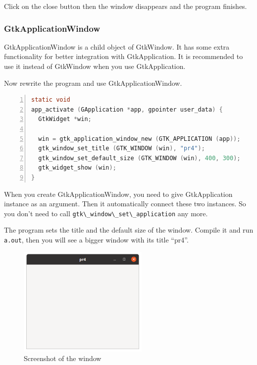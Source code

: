 Click on the close button then the window disappears and the program
finishes.

\hypertarget{gtkapplicationwindow}{%
\subsubsection{GtkApplicationWindow}\label{gtkapplicationwindow}}

GtkApplicationWindow is a child object of GtkWindow. It has some extra
functionality for better integration with GtkApplication. It is
recommended to use it instead of GtkWindow when you use GtkApplication.

Now rewrite the program and use GtkApplicationWindow.

\begin{lstlisting}[language=C, numbers=left]
static void
app_activate (GApplication *app, gpointer user_data) {
  GtkWidget *win;

  win = gtk_application_window_new (GTK_APPLICATION (app));
  gtk_window_set_title (GTK_WINDOW (win), "pr4");
  gtk_window_set_default_size (GTK_WINDOW (win), 400, 300);
  gtk_widget_show (win);
}
\end{lstlisting}

When you create GtkApplicationWindow, you need to give GtkApplication
instance as an argument. Then it automatically connect these two
instances. So you don't need to call
\passthrough{\lstinline!gtk\_window\_set\_application!} any more.

The program sets the title and the default size of the window. Compile
it and run \passthrough{\lstinline!a.out!}, then you will see a bigger
window with its title ``pr4''.

\begin{figure}
\centering
\includegraphics[width=6.3cm,height=5.325cm]{../image/screenshot_pr4.png}
\caption{Screenshot of the window}
\end{figure}
